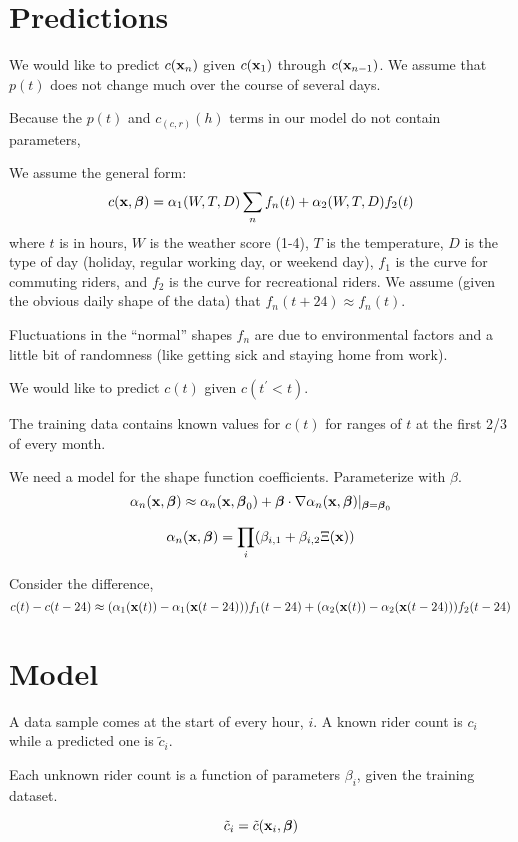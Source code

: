 \documentclass{article}
\newcommand{\bx}{{\bf x}}
\newcommand{\bbeta}{\boldsymbol\beta}
\begin{document}
\section*{Predictions}

We would like to predict $c(\bx_n)$ given $c(\bx_1)$ through
$c(\bx_{n-1})$. We assume that $p(t)$ does not change much over the
course of several days.

Because the $p(t)$ and $c_{(c,r)}(h)$ terms in our model do not
contain parameters,


We assume the general form:
\[
c(\bx, \bbeta) = \alpha_1(W, T, D) \sum_n f_n(t) + \alpha_2(W, T, D) f_2(t)
\]
where $t$ is in hours, $W$ is the weather score (1-4), $T$ is the
temperature, $D$ is the type of day (holiday, regular working day, or
weekend day), $f_1$ is the curve for commuting riders, and $f_2$
is the curve for recreational riders. We assume (given the obvious
daily shape of the data) that $f_n(t + 24) \approx f_n(t)$.

Fluctuations in the ``normal'' shapes $f_n$ are due to environmental
factors and a little bit of randomness (like getting sick and staying
home from work).

We would like to predict $c(t)$ given $c(t^{\prime} < t)$.

The training data contains known values for $c(t)$ for ranges of $t$
at the first 2/3 of every month.


We need a model for the shape function coefficients. Parameterize with
$\beta$.
\[
\alpha_n(\bx, \bbeta) \approx \alpha_n(\bx, \bbeta_0) + \bbeta \cdot \nabla
\alpha_n(\bx, \bbeta) |_{\bbeta = \bbeta_0}
\]

\[
\alpha_n(\bx, \bbeta) = \prod_i (\beta_{i,1} + \beta_{i,2} \Xi(\bx))
\]

Consider the difference,
\[
c(t) - c(t - 24) \approx
(\alpha_1(\bx(t)) - \alpha_1(\bx(t - 24))) f_1(t - 24) +
(\alpha_2(\bx(t)) - \alpha_2(\bx(t - 24))) f_2(t - 24)
\]

\section*{Model}

A data sample comes at the start of every hour, $i$. A known rider
count is $c_i$ while a predicted one is $\tilde{c}_i$.

Each unknown rider count is a function of parameters $\beta_i$, given the
training dataset.

\[
\tilde{c}_i = \tilde{c}(\bx_i, \bbeta)
\]
\end{document}
